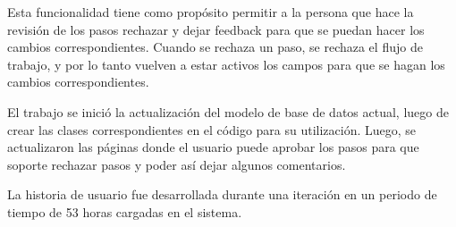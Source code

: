 Esta funcionalidad tiene como propósito permitir a la persona que hace la revisión de los pasos rechazar y dejar feedback para que se puedan hacer los cambios correspondientes. Cuando se rechaza un paso, se rechaza el flujo de trabajo, y por lo tanto vuelven a estar activos los campos para que se hagan los cambios correspondientes.

El trabajo se inició la actualización del modelo de base de datos actual, luego de crear las clases correspondientes en el código para su utilización. Luego, se actualizaron las páginas donde el usuario puede aprobar los pasos para que soporte rechazar pasos y poder así dejar algunos comentarios. 

La historia de usuario fue desarrollada durante una iteración en un periodo de tiempo de 53 horas cargadas en el sistema.
